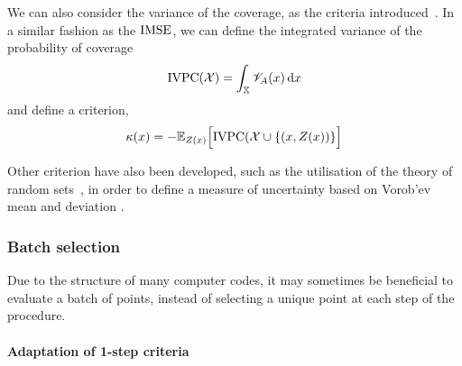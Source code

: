 \documentclass[../../Main_ManuscritThese.tex]{subfiles}
\begin{document}
We can also consider the variance of the coverage, as the criteria introduced~\cite{bect_sequential_2012}.
In a similar fashion as the $\operatorname{\mathrm{IMSE}}$, we can define the integrated variance of the probability of coverage
\begin{equation}
  \label{eq:IVPC_def}
\mathrm{IVPC}(\mathcal{X}) =  \int_{\mathbb{X}} \mathscr{V}_A(x)\,\mathrm{d}x
\end{equation}
and define a criterion,
\begin{equation}
  \label{eq:expected_aIVPC}
  \kappa(x) = -\mathbb{E}_{Z(x)}\Big[\mathrm{IVPC}(\mathcal{X} \cup \{   \left(x, Z(x) \right)  \}     \Big]
\end{equation}

Other criterion have also been developed, such as the utilisation of the theory of random sets~\cite{el_amri_data-driven_2019}, in order to define a measure of uncertainty based on Vorob'ev mean and deviation \cite{vorobyev_new_2003}.


\subsubsection{Batch selection}
Due to the structure of many computer codes, it may sometimes be beneficial to evaluate a batch of points, instead of selecting a unique point at each step of the procedure.
\paragraph{Adaptation of 1-step criteria}
\end{document}
